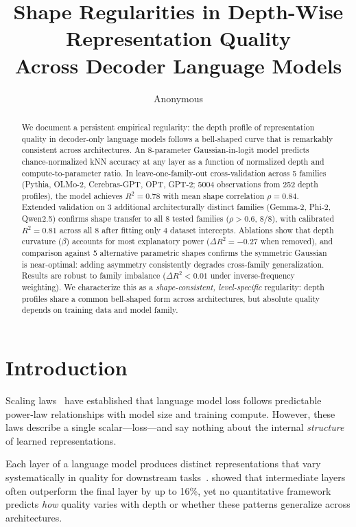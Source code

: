 \documentclass{article}
\title{Shape Regularities in Depth-Wise Representation Quality\\Across Decoder Language Models}
\author{
  Anonymous
}
\begin{document}
\ifcolmsubmission
\linenumbers
\fi

\maketitle

\begin{abstract}
We document a persistent empirical regularity: the depth profile of representation quality in decoder-only language models follows a bell-shaped curve that is remarkably consistent across architectures. An 8-parameter Gaussian-in-logit model predicts chance-normalized kNN accuracy at any layer as a function of normalized depth and compute-to-parameter ratio. In leave-one-family-out cross-validation across 5 families (Pythia, OLMo-2, Cerebras-GPT, OPT, GPT-2; 5004 observations from 252 depth profiles), the model achieves $R^2 = 0.78$ with mean shape correlation $\rho = 0.84$. Extended validation on 3 additional architecturally distinct families (Gemma-2, Phi-2, Qwen2.5) confirms shape transfer to all 8 tested families ($\rho > 0.6$, 8/8), with calibrated $R^2 = 0.81$ across all 8 after fitting only 4 dataset intercepts. Ablations show that depth curvature ($\beta$) accounts for most explanatory power ($\Delta R^2 = -0.27$ when removed), and comparison against 5 alternative parametric shapes confirms the symmetric Gaussian is near-optimal: adding asymmetry consistently degrades cross-family generalization. Results are robust to family imbalance ($\Delta R^2 < 0.01$ under inverse-frequency weighting). We characterize this as a \emph{shape-consistent, level-specific} regularity: depth profiles share a common bell-shaped form across architectures, but absolute quality depends on training data and model family.
\end{abstract}

\section{Introduction}

Scaling laws~\citep{kaplan2020scaling, hoffmann2022training} have established that language model loss follows predictable power-law relationships with model size and training compute. However, these laws describe a single scalar---loss---and say nothing about the internal \emph{structure} of learned representations.

Each layer of a language model produces distinct representations that vary systematically in quality for downstream tasks~\citep{tenney2019bert, liu2019linguistic, ethayarajh2019contextual}. \citet{gao2024layerwise} showed that intermediate layers often outperform the final layer by up to 16\%, yet no quantitative framework predicts \emph{how} quality varies with depth or whether these patterns generalize across architectures.
\end{document}
